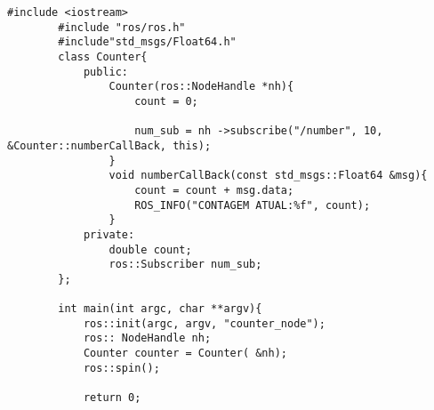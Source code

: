 \documentclass[letterpaper]{article}
\begin{document}
    \begin{lstlisting}[style=cppStyle, title= counter.cpp ] 
        #include <iostream>
        #include "ros/ros.h"
        #include"std_msgs/Float64.h"
        class Counter{
            public:
                Counter(ros::NodeHandle *nh){
                    count = 0;
        
                    num_sub = nh ->subscribe("/number", 10, &Counter::numberCallBack, this);
                }
                void numberCallBack(const std_msgs::Float64 &msg){
                    count = count + msg.data;
                    ROS_INFO("CONTAGEM ATUAL:%f", count); 
                }
            private:
                double count;
                ros::Subscriber num_sub;
        };
        
        int main(int argc, char **argv){
            ros::init(argc, argv, "counter_node");
            ros:: NodeHandle nh;
            Counter counter = Counter( &nh);
            ros::spin();    
        
            return 0;    
    \end{lstlisting}
\end{document}
